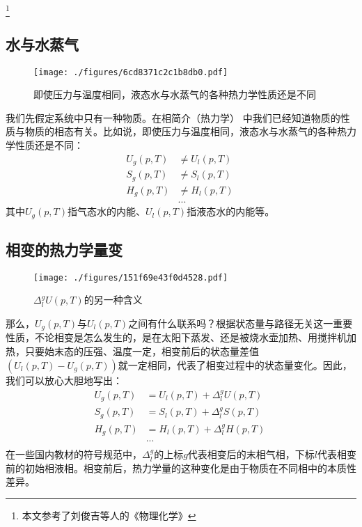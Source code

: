 
\footnote{本文参考了刘俊吉等人的《物理化学》}

\subsection{水与水蒸气}
\begin{figure}[ht]
\centering
\texttt{[image: ./figures/6cd8371c2c1b8db0.pdf]}
\caption{即使压力与温度相同，液态水与水蒸气的各种热力学性质还是不同} \label{fig_PTTVC2_1}
\end{figure}

我们先假定系统中只有一种物质。在相简介（热力学） 中我们已经知道物质的性质与物质的相态有关。比如说，即使压力与温度相同，液态水与水蒸气的各种热力学性质还是不同：
$$
\begin{aligned}
U_g(p,T) &\ne U_l(p,T)\\
S_g(p,T) &\ne S_l(p,T)\\
H_g(p,T) &\ne H_l(p,T)\\
&...
\end{aligned}~
$$
其中$U_g(p,T)$指气态水的内能、$U_l(p,T)$指液态水的内能等。

\subsection{相变的热力学量变}
\begin{figure}[ht]
\centering
\texttt{[image: ./figures/151f69e43f0d4528.pdf]}
\caption{$\Delta ^ g_l U (p,T)$的另一种含义} \label{fig_PTTVC2_2}
\end{figure}

那么，$U_g(p,T)$与$U_l(p,T)$之间有什么联系吗？根据状态量与路径无关这一重要性质，不论相变是怎么发生的，是在太阳下蒸发、还是被烧水壶加热、用搅拌机加热，只要始末态的压强、温度一定，相变前后的状态量差值$(U_l(p,T) - U_g(p,T))$就一定相同，代表了相变过程中的状态量变化。因此，我们可以放心大胆地写出：
$$
\begin{aligned}
U_g(p,T) &= U_l(p,T) + \Delta ^ g_l U (p,T)\\
S_g(p,T) &= S_l(p,T) + \Delta ^ g_l S (p,T)\\
H_g(p,T) &= H_l(p,T) + \Delta ^ g_l H (p,T)\\
&...\\
\end{aligned}~
$$
在一些国内教材的符号规范中，$\Delta^g_l$的上标$g$代表相变后的末相气相，下标$l$代表相变前的初始相液相。相变前后，热力学量的这种变化是由于物质在不同相中的本质性差异。

